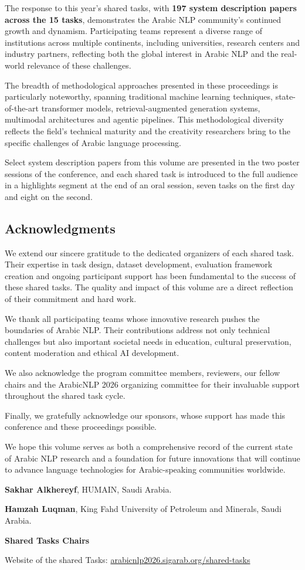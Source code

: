 The response to this year's shared tasks, with \textbf{197 system description papers across the 15 tasks}, demonstrates the Arabic NLP community's continued growth and dynamism. Participating teams represent a diverse range of institutions across multiple continents, including universities, research centers and industry partners, reflecting both the global interest in Arabic NLP and the real-world relevance of these challenges.

The breadth of methodological approaches presented in these proceedings is particularly noteworthy, spanning traditional machine learning techniques, state-of-the-art transformer models, retrieval-augmented generation systems, multimodal architectures and agentic pipelines. This methodological diversity reflects the field's technical maturity and the creativity researchers bring to the specific challenges of Arabic language processing.

Select system description papers from this volume are presented in the two poster sessions of the conference, and each shared task is introduced to the full audience in a highlights segment at the end of an oral session, seven tasks on the first day and eight on the second.

\subsection*{\textbf{Acknowledgments}}

We extend our sincere gratitude to the dedicated organizers of each shared task. Their expertise in task design, dataset development, evaluation framework creation and ongoing participant support has been fundamental to the success of these shared tasks. The quality and impact of this volume are a direct reflection of their commitment and hard work.

We thank all participating teams whose innovative research pushes the boundaries of Arabic NLP. Their contributions address not only technical challenges but also important societal needs in education, cultural preservation, content moderation and ethical AI development.

We also acknowledge the program committee members, reviewers, our fellow chairs and the ArabicNLP 2026 organizing committee for their invaluable support throughout the shared task cycle.

Finally, we gratefully acknowledge our sponsors, whose support has made this conference and these proceedings possible.

We hope this volume serves as both a comprehensive record of the current state of Arabic NLP research and a foundation for future innovations that will continue to advance language technologies for Arabic-speaking communities worldwide.

\textbf{Sakhar Alkhereyf}, HUMAIN, Saudi Arabia.

\textbf{Hamzah Luqman}, King Fahd University of Petroleum and Minerals, Saudi Arabia.

\textbf{Shared Tasks Chairs}


Website of the shared Tasks: \href{https://arabicnlp2026.sigarab.org/shared-tasks}{arabicnlp2026.sigarab.org/shared-tasks}
